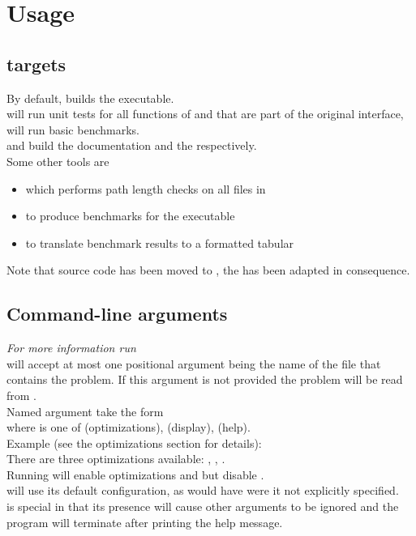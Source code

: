\section{Usage}\label{sec-usage}

\subsection{ targets}

By default,  builds the  executable.\\
 will run unit tests for all functions of
 and  that are part of the original
interface,  will run basic benchmarks.\\

 and  build the documentation and the
 respectively.\\

Some other tools are
\begin{itemize}
    \item {} which performs path length checks on all files in 
    \item {} to produce benchmarks for the executable
    \item {} to translate benchmark results to a formatted tabular
\end{itemize}

Note that source code has been moved to , the  has
been adapted in consequence.

\subsection{Command-line arguments}

\textit{For more information run }\\

 will accept at most one positional argument being the name of the
file that contains the problem. If this argument is not provided the problem will
be read from .\\

Named argument take the form \ttt{-[CATEGORY][FLAGS]}\\
where  is one of  (optimizations),  (display),
 (help).\\

Example (see the optimizations section for details):\\
There are three optimizations available: , , .\\
Running  will enable optimizations  and 
but disable .\\
 will use its default configuration, as would have  were it not
explicitly specified.\\

 is special in that its presence will cause other arguments to be ignored
and the program will terminate after printing the help message.\\


